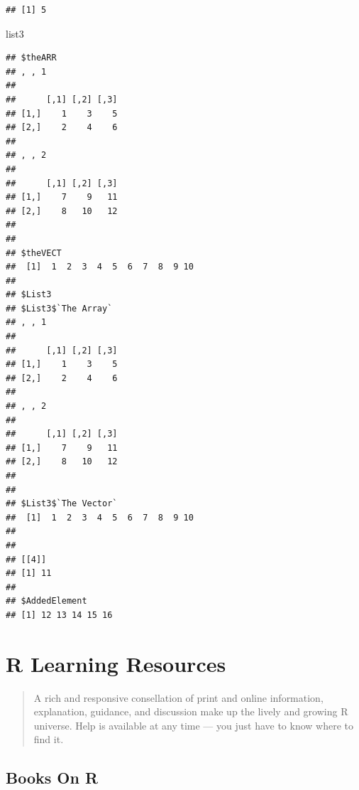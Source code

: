 \documentclass[]{book}
\newenvironment{Shaded}{\begin{snugshade}}{\end{snugshade}}
\newcommand{\NormalTok}[1]{#1}
\theoremstyle{definition}
\theoremstyle{definition}
\theoremstyle{definition}
\theoremstyle{remark}
\begin{document}
\begin{verbatim}
## [1] 5
\end{verbatim}

\begin{Shaded}
\begin{Highlighting}[]
\NormalTok{list3}
\end{Highlighting}
\end{Shaded}

\begin{verbatim}
## $theARR
## , , 1
## 
##      [,1] [,2] [,3]
## [1,]    1    3    5
## [2,]    2    4    6
## 
## , , 2
## 
##      [,1] [,2] [,3]
## [1,]    7    9   11
## [2,]    8   10   12
## 
## 
## $theVECT
##  [1]  1  2  3  4  5  6  7  8  9 10
## 
## $List3
## $List3$`The Array`
## , , 1
## 
##      [,1] [,2] [,3]
## [1,]    1    3    5
## [2,]    2    4    6
## 
## , , 2
## 
##      [,1] [,2] [,3]
## [1,]    7    9   11
## [2,]    8   10   12
## 
## 
## $List3$`The Vector`
##  [1]  1  2  3  4  5  6  7  8  9 10
## 
## 
## [[4]]
## [1] 11
## 
## $AddedElement
## [1] 12 13 14 15 16
\end{verbatim}

\hypertarget{r-learning-resources}{%
\chapter{R Learning Resources}\label{r-learning-resources}}

\begin{quote}
A rich and responsive consellation of print and online information,
explanation, guidance, and discussion make up the lively and growing R
universe. Help is available at any time --- you just have to know where
to find it.
\end{quote}

\hypertarget{books-on-r}{%
\section{Books On R}\label{books-on-r}}
\end{document}
